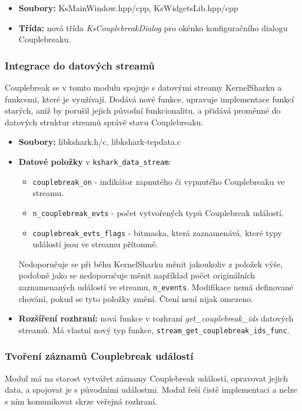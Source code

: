 \begin{itemize}
    \item \textbf{Soubory:} KsMainWindow.hpp/cpp, KsWidgetsLib.hpp/cpp
    \item \textbf{Třída:} nová třída \emph{KsCouplebreakDialog} pro okénko konfiguračního dialogu Couplebreaku.
\end{itemize}

\subsubsection*{Integrace do datových streamů}
Couplebreak se v tomto modulu spojuje s datovými streamy KernelSharku a funkcemi, které je využívají. Dodává nové funkce, upravuje implementace funkcí starých, aniž by porušil jejich původní funkcionalitu, a přidává proměnné do datových struktur streamů správě stavu Couplebreaku.

\begin{itemize}
    \item \textbf{Soubory:} libkshark.h/c, libkshark-tepdata.c
    \item \textbf{Datové položky} v \texttt{kshark\_data\_stream}:
    \begin{itemize}
        \item \texttt{couplebreak\_on} - indikátor zapnutého či vypnutého Couplebreaku ve streamu.
        \item \texttt{n\_couplebreak\_evts} - počet vytvořených typů Couplebreak událostí.
        \item \texttt{couplebreak\_evts\_flags} - bitmaska, která zaznamenává, které typy událostí jsou ve streamu přítomné.
    \end{itemize}

    Nedoporučuje se při běhu KernelSharku měnit jakoukoliv z položek výše, podobně jako se nedoporučuje měnit například počet originálních zaznamenaných událostí ve streamu, \texttt{n\_events}. Modifikace nemá definované chování, pokud se tyto položky změní. Čtení není nijak omezeno.

    \item \textbf{Rozšíření rozhraní:} nová funkce v rozhraní \emph{get\_couplebreak\_ids} datových streamů. Má vlastní nový typ funkce, \texttt{stream\_get\_couplebreak\_ids\_func}.
\end{itemize}

\subsubsection*{Tvoření záznamů Couplebreak událostí}
Modul má na starost vytvářet záznamy Couplebreak událostí, opravovat jejich data, a spojovat je s původními událostmi. Modul řeší čistě implementaci a nelze s ním komunikovat skrze veřejná rozhraní.

